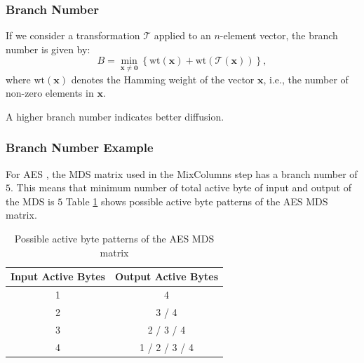 \documentclass{beamer}
\begin{document}
\begin{frame}
\frametitle{Branch Number }

If we consider a transformation $\mathcal{T}$ applied to an $n$-element vector, the branch number is given by:
$$
B = \min_{\mathbf{x} \neq \mathbf{0}} \left\{ \text{wt}(\mathbf{x}) + \text{wt}(\mathcal{T}(\mathbf{x})) \right\},
$$
where $\text{wt}(\mathbf{x})$ denotes the Hamming weight of the vector $\mathbf{x}$, i.e., the number of non-zero elements in $\mathbf{x}$. \linebreak

A higher branch number indicates better diffusion.

\end{frame}
\begin{frame}
\frametitle{Branch Number Example }

For AES \cite{dworkin2001advanced}, the MDS matrix used in the MixColumns step has a branch number of $5$. This means that minimum number of total active byte of input and output of the MDS is $5$ Table \ref{tab:aes-mds} shows possible active byte patterns of the AES MDS matrix.

\begin{table}[h]
\centering
\begin{tabular}{|c|c|}
\hline
\textbf{Input Active Bytes} & \textbf{Output Active Bytes}           \\ \hline
1                           & 4                                      \\ \hline
2                           & 3 / 4                                   \\ \hline
3                           & 2 / 3 / 4                               \\ \hline
4                           & 1 / 2 / 3 / 4                           \\ \hline
\end{tabular}
\caption{Possible active byte patterns of the AES MDS matrix}
\label{tab:aes-mds}
\end{table}

\end{frame}
\end{document}
